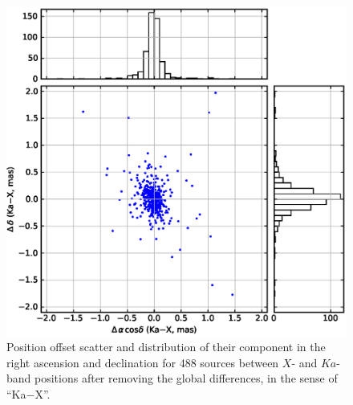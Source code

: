\documentclass{aa-note}   %
\begin{document}
\begin{figure}[hbtp]
    \centering
    \includegraphics[width=\columnwidth]{figs/xka-sx-scatter}
    \caption[]{\label{fig:xka-sx-pos-offset}
        Position offset scatter and distribution of their component in the right ascension and declination for 488 sources between $X$- and $Ka$-band positions after removing the global differences, in the sense of ``Ka$-$X''.
    }
\end{figure}
\end{document}
